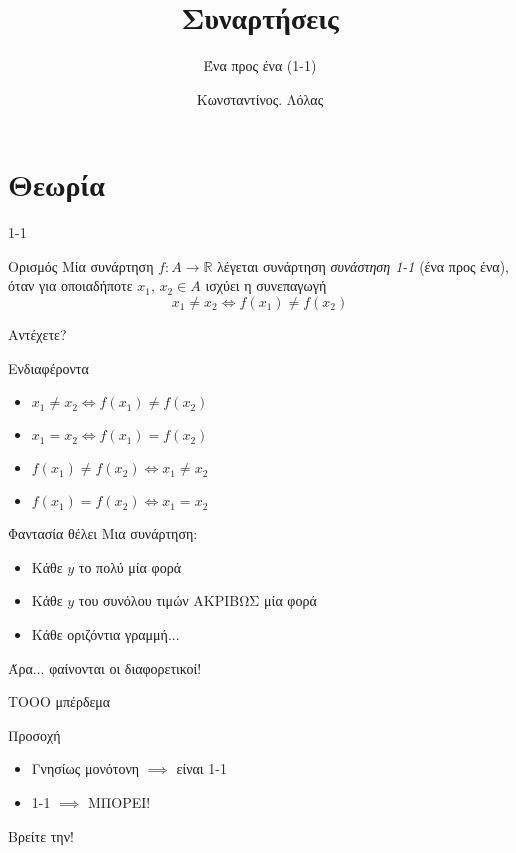 \documentclass[greek]{beamer}
\title{Συναρτήσεις}
\subtitle{Ένα προς ένα (1-1)}
\author[Λόλας]{Κωνσταντίνος. Λόλας}
\date{}
\begin{document}
\begin{frame}
 \titlepage
\end{frame}

\section{Θεωρία}
\begin{frame}{1-1}
 \begin{block}{Ορισμός}
  Μία συνάρτηση $f:Α\to\mathbb{R}$ λέγεται συνάρτηση \emph{συνάστηση 1-1} (ένα προς ένα), όταν για οποιαδήποτε $x_1$, $x_2\in Α$ ισχύει η συνεπαγωγή
  $$x_1\ne x_2 \iff f(x_1)\ne f(x_2)$$
 \end{block}
\end{frame}

\begin{frame}{Αντέχετε?}
 \begin{exampleblock}{Ενδιαφέροντα}
  \begin{itemize}
   \item $x_1\ne x_2 \iff f(x_1)\ne f(x_2)$
   \item $x_1= x_2 \iff f(x_1)= f(x_2)$
   \item $f(x_1)\ne f(x_2) \iff x_1\ne x_2$
   \item $f(x_1)= f(x_2) \iff x_1= x_2$
  \end{itemize}
 \end{exampleblock}
\end{frame}

\begin{frame}{Φαντασία θέλει}
 Μια συνάρτηση:
 \begin{itemize}
  \item Κάθε $y$ το πολύ μία φορά \pause
  \item Κάθε $y$ του συνόλου τιμών ΑΚΡΙΒΩΣ μία φορά \pause
  \item Κάθε οριζόντια γραμμή...
 \end{itemize}
 Άρα... φαίνονται οι διαφορετικοί!
\end{frame}

\begin{frame}{ΤΟΟΟ μπέρδεμα}
 \begin{alertblock}{Προσοχή}
  \begin{itemize}
   \item Γνησίως μονότονη $\implies$ \pause είναι 1-1 \pause
   \item  1-1 $\implies$ \pause ΜΠΟΡΕΙ!
  \end{itemize}
 \end{alertblock}
 Βρείτε την!
\end{frame}
\end{document}

